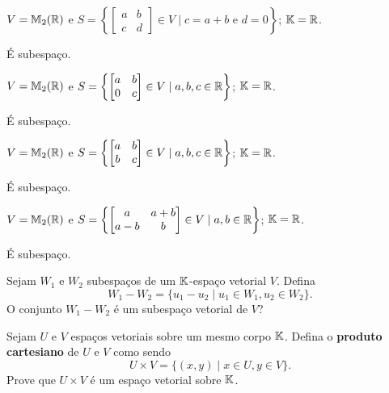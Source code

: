 \documentclass[12pt]{exam}
\begin{document}
\begin{exercicio}
	$V = \mathbb{M}_2(\mathbb{R})$ e $S = \left\{\begin{bmatrix} a & b\\ c & d\end{bmatrix} \in V \mid c = a + b \mbox{ e } d = 0\right\}$; $\mathbb{K} = \mathbb{R}$.
	\begin{solucao}
		\'E subespa\c{c}o.
	\end{solucao}
\end{exercicio}

\begin{exercicio}
	$V = \mathbb{M}_2(\mathbb{R})$ e $S = \left\{\begin{bmatrix} a & b\\ 0 & c\end{bmatrix} \in V \mid a, b, c \in \mathbb{R}\right\}$; $\mathbb{K} = \mathbb{R}$.
	\begin{solucao}
		\'E subespa\c{c}o.
	\end{solucao}
\end{exercicio}

\begin{exercicio}
	$V = \mathbb{M}_2(\mathbb{R})$ e $S = \left\{\begin{bmatrix} a & b\\ b & c\end{bmatrix} \in V \mid a, b, c \in \mathbb{R}\right\}$; $\mathbb{K} = \mathbb{R}$.
	\begin{solucao}
		\'E subespa\c{c}o.
	\end{solucao}
\end{exercicio}

\begin{exercicio}\label{subespacofim}
	$V = \mathbb{M}_2(\mathbb{R})$ e $S = \left\{\begin{bmatrix} a & a+b\\ a-b & b\end{bmatrix} \in V \mid a, b \in \mathbb{R} \right\}$; $\mathbb{K} = \mathbb{R}$.
	\begin{solucao}
		\'E subespa\c{c}o.
	\end{solucao}
\end{exercicio}

\begin{exercicio}
	Sejam $W_1$ e $W_2$  subespa\c{c}os de um $\mathbb{K}$-espa\c{c}o vetorial $V$. Defina
	\[
	W_1 - W_2 = \{ u_1 - u_2 \mid u_1 \in W_1, u_2 \in W_2\}.
	\]
	O conjunto $W_1 - W_2$ \'e um subespa\c{c}o vetorial de $V$?
\end{exercicio}

\begin{exercicio}
    Sejam $U$ e $V$ espaços vetoriais sobre um mesmo corpo $\mathbb{K}$. Defina o \textbf{produto cartesiano} de $U$ e $V$ como sendo
    \[
        U \times V = \{(x, y) \mid x \in U, y \in V\}.
    \]
    Prove que $U \times V$ é um espaço vetorial sobre $\mathbb{K}$.
\end{exercicio}
\end{document}
